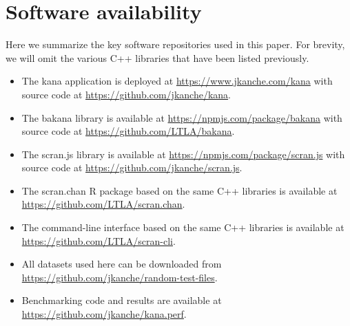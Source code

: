 \documentclass{article}
\begin{document}
\section{Software availability}

Here we summarize the key software repositories used in this paper.
For brevity, we will omit the various C++ libraries that have been listed previously.

\begin{itemize}
\item The kana application is deployed at \url{https://www.jkanche.com/kana} with source code at \url{https://github.com/jkanche/kana}.
\item The bakana library is available at \url{https://npmjs.com/package/bakana} with source code at \url{https://github.com/LTLA/bakana}.
\item The scran.js library is available at \url{https://npmjs.com/package/scran.js} with source code at \url{https://github.com/jkanche/scran.js}.
\item The scran.chan R package based on the same C++ libraries is available at \url{https://github.com/LTLA/scran.chan}.
\item The command-line interface based on the same C++ libraries is available at \url{https://github.com/LTLA/scran-cli}.
\item All datasets used here can be downloaded from \url{https://github.com/jkanche/random-test-files}.
\item Benchmarking code and results are available at \url{https://github.com/jkanche/kana.perf}.
\end{itemize}



\end{document}
